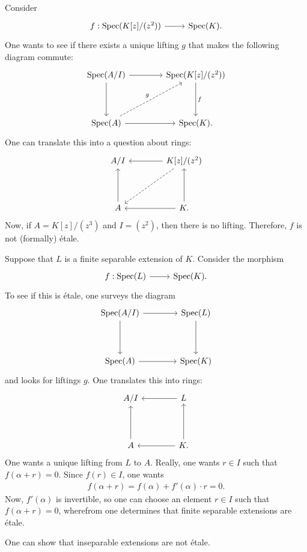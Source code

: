 \documentclass [11 pt, oneside] {article}
\begin{document}
\begin{example}[ ]\label{}\text{}
Consider
\[
\begin{tikzcd}
	f: \Spec(K[z]/(z^{2})) \ar[r] & \Spec(K).
\end{tikzcd}
\]
One wants to see if there exists a unique lifting $g$ that makes the following diagram commute:
\[
\begin{tikzcd}[sep = 4 em]
	\Spec(A/I) \ar[r]\ar[d]& \Spec (K[z]/(z^{2})) \ar[d,"f"]\\
	\Spec(A)\ar[r]\ar[ur,dashed,"g"] & \Spec (K).
\end{tikzcd}
\]
One can translate this into a question about rings:
\[
\begin{tikzcd}[sep = 4 em]
	A/I & K[z]/(z^{2}) \ar[l]\ar[ld,dashed]\\
	A\ar[u] & K.\ar[l]\ar[u]
\end{tikzcd}
\]
Now, if $A= K[z]/(z^{3})$ and $I = (z^{2})$, then there is no lifting. Therefore, $f$ is not (formally) \'etale.
\end{example}

\begin{example}\label{}\text{}
Suppose that $L$ is a finite separable extension of $K$. Consider the morphism
\[
\begin{tikzcd}
	f: \Spec(L) \ar[r] & \Spec(K).
\end{tikzcd}
\]
To see if this is \'etale, one surveys the diagram
\[
\begin{tikzcd}[sep = 4 em]
	\Spec(A/I)\ar[r] \ar[d] & \Spec (L) \ar[d]\\
	\Spec(A)\ar[r]& \Spec (K)
\end{tikzcd}
\]
and looks for liftings $g$. One translates this into rings:
\[
\begin{tikzcd}[sep = 4 em]
	A/I & L\ar[l]\\
	A\ar[u]& K.\ar[l]\ar[u]
\end{tikzcd}
\]
One wants a unique lifting from $L$ to $A$.
Really, one wants $r\in I$ such that $f(\alpha+r) = 0$.
Since $f(r)\in I$, one wants
\begin{align*}
	f(\alpha+r) = f (\alpha) + f'(\alpha) \cdot r = 0.
\end{align*}
Now, $f'(\alpha)$ is invertible, so one can choose an element $r\in I$ such that $f(\alpha+r)=0$, wherefrom one determines that finite separable extensions are \'etale.
\end{example}

One can show that inseparable extensions are not \'etale.
\end{document}
